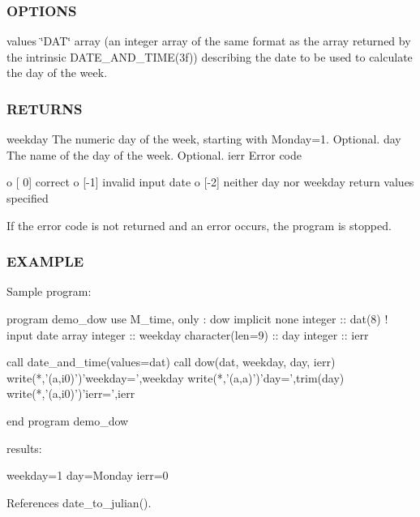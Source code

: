 \subsubsection*{O\+P\+T\+I\+O\+NS}

values \char`\"{}\+D\+A\+T\char`\"{} array (an integer array of the same format as the array returned by the intrinsic D\+A\+T\+E\+\_\+\+A\+N\+D\+\_\+\+T\+I\+M\+E(3f)) describing the date to be used to calculate the day of the week. \subsubsection*{R\+E\+T\+U\+R\+NS}

weekday The numeric day of the week, starting with Monday=1. Optional. day The name of the day of the week. Optional. ierr Error code \begin{DoxyVerb}     o [ 0] correct
     o [-1] invalid input date
     o [-2] neither day nor weekday return values specified

     If the error code is not returned and an error occurs,
     the program is stopped.
\end{DoxyVerb}


\subsubsection*{E\+X\+A\+M\+P\+LE}

\begin{DoxyVerb}Sample program:

 program demo_dow
 use M_time, only : dow
 implicit none
 integer          :: dat(8)     ! input date array
 integer          :: weekday
 character(len=9) :: day
 integer          :: ierr

   call date_and_time(values=dat)
   call dow(dat, weekday, day, ierr)
   write(*,'(a,i0)')'weekday=',weekday
   write(*,'(a,a)')'day=',trim(day)
   write(*,'(a,i0)')'ierr=',ierr

 end program demo_dow

results:

 weekday=1
 day=Monday
 ierr=0 \end{DoxyVerb}
 

References date\+\_\+to\+\_\+julian().

\mbox{\label{namespacem__time_af3c98ac7124f9fe2584cc76688b00094}} 
